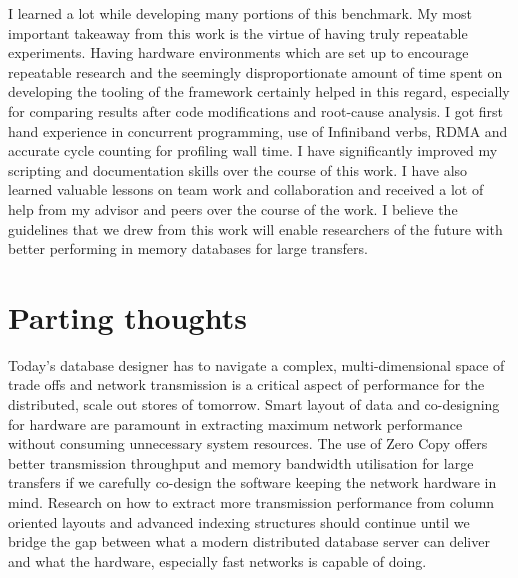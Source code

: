 I learned a lot while developing many portions of this benchmark. My most important takeaway from this work 
is the virtue of having truly repeatable experiments. Having hardware environments which are set up to encourage 
repeatable research and the seemingly disproportionate amount of time spent on developing the tooling of the 
framework certainly helped in this regard, especially for comparing results after code modifications and root-cause analysis.
I got first hand experience in concurrent programming, use of Infiniband verbs, RDMA and accurate cycle counting 
for profiling wall time. I have significantly improved my scripting and documentation skills over the course of this work. 
I have also learned valuable lessons on team work and collaboration and received a lot of help from my 
advisor and peers over the course of the work. I believe the guidelines that we drew from this work will 
enable researchers of the future with better performing in memory databases for large transfers. 

\section{Parting thoughts}
Today's database designer has to navigate a complex, multi-dimensional space of trade offs and network transmission 
is a critical aspect of performance for the distributed, scale out stores of tomorrow. Smart layout of data and  
co-designing for hardware are paramount in extracting maximum network performance without consuming 
unnecessary system resources. The use of Zero Copy offers better transmission throughput and memory bandwidth utilisation for 
large transfers if we carefully co-design the software keeping the network hardware in mind. Research on how to extract 
more transmission performance from column oriented layouts and advanced indexing structures should continue until we bridge the 
gap between what a modern distributed database server can deliver and what the hardware, especially fast networks is capable of doing.